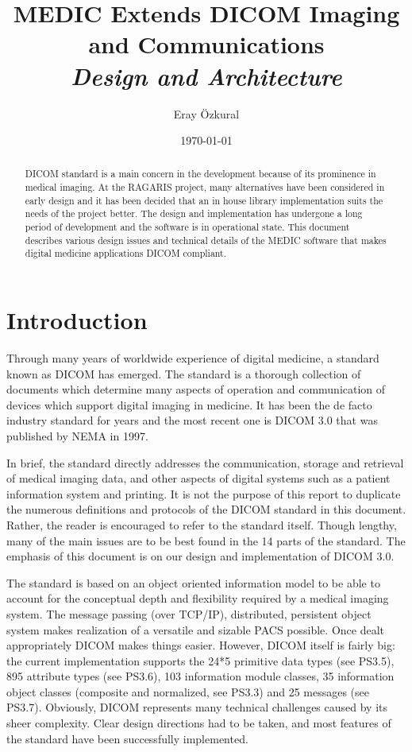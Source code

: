 \documentclass[a4paper,10pt]{article}
\title{ MEDIC Extends DICOM Imaging and Communications \\
\textit{Design and Architecture} }
\author{Eray {\"O}zkural}
\date{\today}
\begin{document}
\maketitle
\begin{abstract}
DICOM standard is a main concern in the development
because of its prominence in medical imaging. At the RAGARIS project,
many alternatives have been considered in early design and it has been
decided that an in house library implementation suits the needs of the project
better.
The design and implementation has undergone a long period of development and the
software is in operational state.
This document describes various design issues and technical details of the
MEDIC software that makes digital medicine applications DICOM compliant.
\end{abstract}

\section{Introduction}

Through many years of worldwide experience of digital medicine, a standard
known as DICOM has emerged. The standard is a thorough collection of
documents which determine many aspects of operation and communication of
devices which support digital imaging in medicine. It has been the de facto
industry standard for years and the most recent one is DICOM 3.0 that was
published by NEMA in 1997.

In brief, the standard directly addresses the communication, storage and
retrieval of medical imaging data, and other aspects of digital systems such
as a patient information system and printing. It is not the purpose of this
report to duplicate the numerous definitions and protocols of the DICOM
standard in this document. Rather, the reader is encouraged to refer to the
standard itself. Though lengthy, many of the main issues are to be best
found in the 14 parts of the standard. The emphasis of this document is on
our design and implementation of DICOM 3.0.

The standard is based on an object oriented information model to be able to
account for the conceptual depth and flexibility required by a medical
imaging system. The message passing (over TCP/IP), distributed, persistent
object system makes realization of a versatile and sizable PACS possible.
Once dealt appropriately DICOM makes things easier. However, DICOM itself is
fairly big: the current implementation supports the 24*5 primitive data
types (see PS3.5), 895 attribute types (see PS3.6), 103 information module
classes, 35 information object classes (composite and normalized, see PS3.3)
and 25 messages (see PS3.7). Obviously, DICOM represents many technical
challenges caused by its sheer complexity. Clear design directions had to be
taken, and most features of the standard have been successfully implemented.
\end{document}
